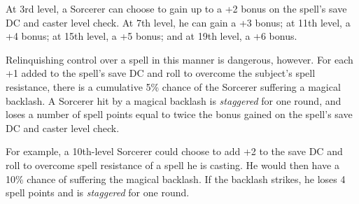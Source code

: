 At 3rd level, a Sorcerer can choose to gain up to a +2 bonus on the spell's save DC and caster level check. 
At 7th level, he can gain a +3 bonus; at 11th level, a +4 bonus; at 15th level, a +5 bonus; and at 19th level, a +6 bonus.

Relinquishing control over a spell in this manner is dangerous, however.
For each +1 added to the spell's save DC and roll to overcome the subject's spell resistance, 
there is a cumulative 5\% chance of the Sorcerer suffering a magical backlash.
A Sorcerer hit by a magical backlash is \emph{staggered} for one round, and loses a number of spell points
equal to twice the bonus gained on the spell's save DC and caster level check.

For example, a 10th-level Sorcerer could choose to add +2 to the save DC and roll to overcome spell resistance of a
 spell he is casting. He would then have a 10\% chance of suffering the magical backlash.
If the backlash strikes, he loses 4 spell points and is \emph{staggered} for one round.